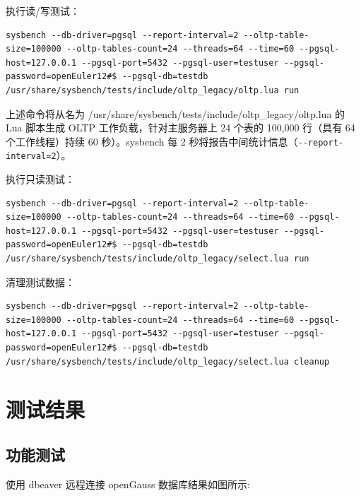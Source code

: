 \documentclass{article}
\begin{document}
执行读/写测试：

\begin{verbatim}
sysbench --db-driver=pgsql --report-interval=2 --oltp-table-size=100000 --oltp-tables-count=24 --threads=64 --time=60 --pgsql-host=127.0.0.1 --pgsql-port=5432 --pgsql-user=testuser --pgsql-password=openEuler12#$ --pgsql-db=testdb /usr/share/sysbench/tests/include/oltp_legacy/oltp.lua run
\end{verbatim}

上述命令将从名为 /usr/share/sysbench/tests/include/oltp\_legacy/oltp.lua 的 Lua 脚本生成 OLTP 工作负载，针对主服务器上 24 个表的 100,000 行（具有 64 个工作线程）持续 60 秒）。sysbench 每 2 秒将报告中间统计信息（\verb!--report-interval=2!）。

执行只读测试：

\begin{verbatim}
sysbench --db-driver=pgsql --report-interval=2 --oltp-table-size=100000 --oltp-tables-count=24 --threads=64 --time=60 --pgsql-host=127.0.0.1 --pgsql-port=5432 --pgsql-user=testuser --pgsql-password=openEuler12#$ --pgsql-db=testdb /usr/share/sysbench/tests/include/oltp_legacy/select.lua run
\end{verbatim}

清理测试数据：

\begin{verbatim}
sysbench --db-driver=pgsql --report-interval=2 --oltp-table-size=100000 --oltp-tables-count=24 --threads=64 --time=60 --pgsql-host=127.0.0.1 --pgsql-port=5432 --pgsql-user=testuser --pgsql-password=openEuler12#$ --pgsql-db=testdb /usr/share/sysbench/tests/include/oltp_legacy/select.lua cleanup
\end{verbatim}


\section{测试结果}

\subsection{功能测试}
使用 dbeaver 远程连接 openGauss 数据库结果如图所示:
\end{document}
